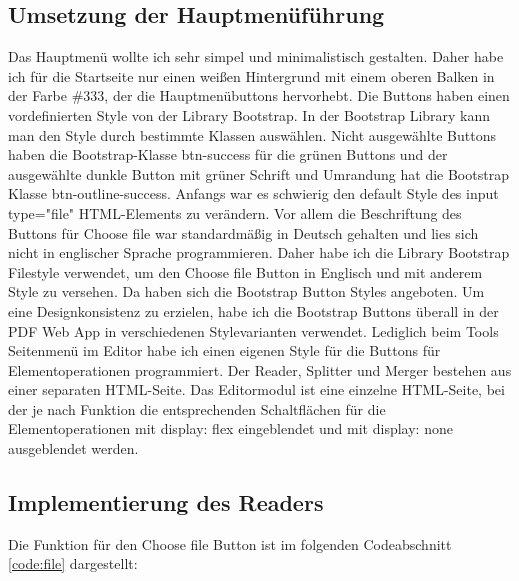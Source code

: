 \subsection{Umsetzung der Hauptmenüführung}
Das Hauptmenü wollte ich sehr simpel und minimalistisch gestalten. Daher habe ich für die Startseite nur einen weißen Hintergrund mit einem oberen Balken in der Farbe \#333, der die Hauptmenübuttons hervorhebt. Die Buttons haben einen vordefinierten Style von der Library Bootstrap. In der Bootstrap Library kann man den Style durch bestimmte Klassen auswählen. Nicht ausgewählte Buttons haben die Bootstrap-Klasse btn-success für die grünen Buttons und der ausgewählte dunkle Button mit grüner Schrift und Umrandung hat die Bootstrap Klasse btn-outline-success. Anfangs war es schwierig den default Style des input type="file" HTML-Elements zu verändern. Vor allem die Beschriftung des Buttons für Choose file war standardmäßig in Deutsch gehalten und lies sich nicht in englischer Sprache programmieren. Daher habe ich die Library Bootstrap Filestyle verwendet, um den Choose file Button in Englisch und mit anderem Style zu versehen. Da haben sich die Bootstrap Button Styles angeboten. Um eine Designkonsistenz zu erzielen, habe ich die Bootstrap Buttons überall in der PDF Web App in verschiedenen Stylevarianten verwendet. Lediglich beim Tools Seitenmenü im Editor habe ich einen eigenen Style für die Buttons für Elementoperationen programmiert. Der Reader, Splitter und Merger bestehen aus einer separaten HTML-Seite. Das Editormodul ist eine einzelne HTML-Seite, bei der je nach Funktion die entsprechenden Schaltflächen für die Elementoperationen mit display: flex eingeblendet und mit display: none ausgeblendet werden. 


\subsection{Implementierung des Readers}
Die Funktion für den Choose file Button ist im folgenden Codeabschnitt \ref{code:file} dargestellt:

